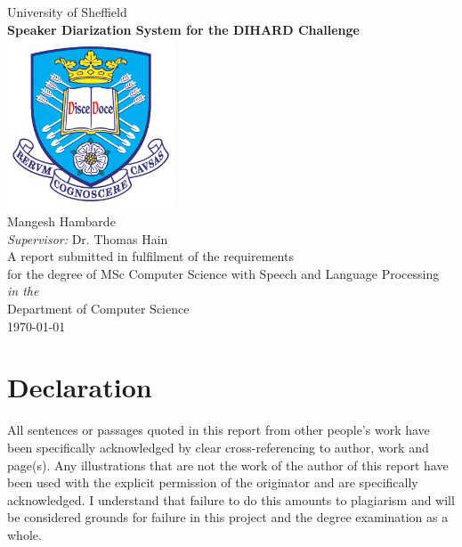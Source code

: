 \documentclass[12pt,oneside]{book}
\begin{document}
\frontmatter

\begin{titlepage}


\begin{center}
{\LARGE University of Sheffield}\\[1.5cm]
\linespread{1.2}\huge {\bfseries Speaker Diarization System for the DIHARD Challenge}\\[1.5cm]
\linespread{1}
\includegraphics[width=5cm]{images/tuoslogo.png}\\[1cm]
{\Large Mangesh Hambarde}\\[1cm]
{\large \emph{Supervisor:} Dr. Thomas Hain}\\[1cm]
\large A report submitted in fulfilment of the requirements\\ for the degree of MSc Computer Science with Speech and Language Processing\\[0.3cm] 
\textit{in the}\\[0.3cm]
Department of Computer Science\\[2cm]
\today
\end{center}

\end{titlepage}


\newpage
\chapter*{\Large Declaration}


All sentences or passages quoted in this report from other people's work have been specifically acknowledged by clear cross-referencing to author, work and page(s). Any illustrations that are not the work of the author of this report have been used with the explicit permission of the originator and are specifically acknowledged. I understand that failure to do this amounts to plagiarism and will be considered grounds for failure in this project and the degree examination as a whole.\\[1cm]
\end{document}
